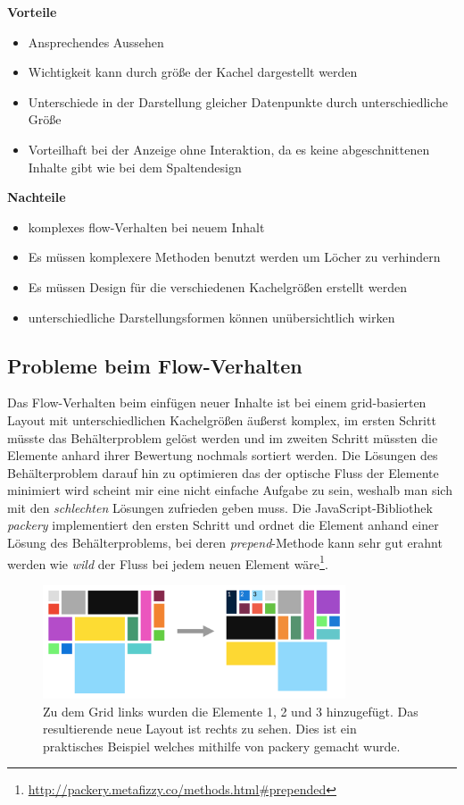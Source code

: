 \documentclass[12pt,twoside]{book}
\begin{document}
\begin{itemize}
  \textbf{Vorteile} \\
  \begin{itemize}
    \item Ansprechendes Aussehen
    \item Wichtigkeit kann durch größe der Kachel dargestellt werden
    \item Unterschiede in der Darstellung gleicher Datenpunkte durch unterschiedliche Größe
    \item Vorteilhaft bei der Anzeige ohne Interaktion, da es keine abgeschnittenen Inhalte gibt wie bei dem Spaltendesign
  \end{itemize}

  \textbf{Nachteile}\\
  \begin{itemize}
    \item komplexes flow-Verhalten bei neuem Inhalt
    \item Es müssen komplexere Methoden benutzt werden um Löcher zu verhindern
    \item Es müssen Design für die verschiedenen Kachelgrößen erstellt werden
    \item unterschiedliche Darstellungsformen können unübersichtlich wirken
  \end{itemize}

  \subsection{Probleme beim Flow-Verhalten}
  Das Flow-Verhalten beim einfügen neuer Inhalte ist bei einem grid-basierten Layout mit unterschiedlichen Kachelgrößen äußerst komplex, im ersten Schritt müsste das Behälterproblem gelöst werden und im zweiten Schritt müssten die Elemente anhard ihrer Bewertung nochmals sortiert werden. Die Lösungen des Behälterproblem darauf hin zu optimieren das der optische Fluss der Elemente minimiert wird scheint mir eine nicht einfache Aufgabe zu sein, weshalb man sich mit den \textit{schlechten} Lösungen zufrieden geben muss. Die JavaScript-Bibliothek \textit{packery} implementiert den ersten Schritt und ordnet die Element anhand einer Lösung des Behälterproblems, bei deren \textit{prepend}-Methode kann sehr gut erahnt werden wie \textit{wild} der Fluss bei jedem neuen Element wäre\footnote{\url{http://packery.metafizzy.co/methods.html\#prepended}}.

  \begin{figure}[H]
    \centering
    \includegraphics[width=0.8\textwidth]{images/grid_flow.png}
    \caption{Zu dem Grid links wurden die Elemente 1, 2 und 3 hinzugefügt. Das resultierende neue Layout ist rechts zu sehen. Dies ist ein praktisches Beispiel welches mithilfe von packery gemacht wurde.}
    \label{fig:awesome_image}
  \end{figure}



\end{itemize}
\end{document}
